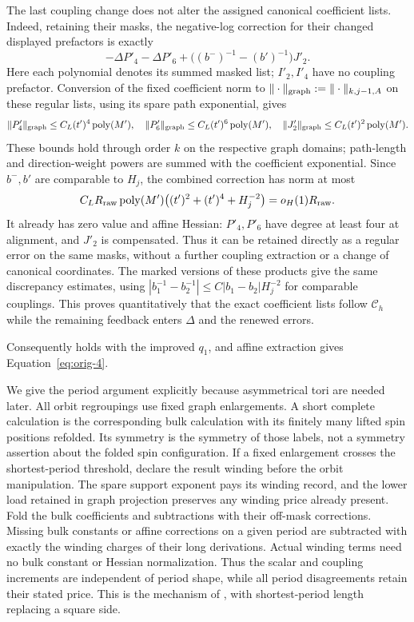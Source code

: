 The last coupling change does not alter the assigned canonical
coefficient lists.  Indeed, retaining their masks, the negative-log
correction for their changed displayed prefactors is exactly
\[
 -\Delta P'_4-\Delta P'_6
       +\bigl((b^-)^{-1}-(b')^{-1}\bigr)J'_2.
\]
Here each polynomial denotes its summed masked list; $I'_2,I'_4$
have no coupling prefactor.  Conversion of the fixed coefficient norm
to $\|\cdot\|_{\rm graph}:=\|\cdot\|_{k,j-1,A}$ on these
regular lists, using its spare path exponential, gives
\[
 \|P'_4\|_{\rm graph}\le C_L(t')^4\operatorname{poly}(M'),
 \quad
 \|P'_6\|_{\rm graph}\le C_L(t')^6\operatorname{poly}(M'),
 \quad
 \|J'_2\|_{\rm graph}\le C_L(t')^2\operatorname{poly}(M').
\]
These bounds hold through order $k$ on the respective graph domains;
path-length and direction-weight powers are summed with the
coefficient exponential.  Since $b^-,b'$ are comparable to $H_j$,
the combined correction has norm at most
\[
 C_LR_{\rm raw}\operatorname{poly}(M')
           \bigl((t')^2+(t')^4+H_j^{-2}\bigr)
       =o_H(1)R_{\rm raw}.
\]
It already has zero value and affine Hessian: $P'_4,P'_6$ have degree
at least four at alignment, and $J'_2$ is compensated.  Thus it can
be retained directly as a regular error on the same masks, without a
further coupling extraction or a change of canonical coordinates.
The marked versions of these products give the same discrepancy
estimates, using $|b_1^{-1}-b_2^{-1}|\le C|b_1-b_2|H_j^{-2}$
for comparable couplings.  This proves quantitatively that the
exact coefficient lists follow $\mathcal C_h$ while the remaining
feedback enters $\Delta$ and the renewed errors.

Consequently  holds with the improved $q_1$,
and affine extraction gives Equation~\eqref{eq:orig-4}.

We give the period argument explicitly because asymmetrical tori are
needed later.  All orbit regroupings use fixed graph enlargements.
A short complete calculation is the corresponding bulk calculation
with its finitely many lifted spin positions refolded.  Its symmetry
is the symmetry of those labels, not a symmetry assertion about the
folded spin configuration.  If a fixed enlargement crosses the
shortest-period threshold, declare the result winding before the
orbit manipulation.  The spare support exponent pays its winding
record, and the lower load retained in graph projection preserves
any winding price already present.  Fold the bulk coefficients and
subtractions with their off-mask corrections.  Missing bulk constants
or affine corrections on a given period are subtracted with exactly
the winding charges of their long derivations.  Actual winding terms
need no bulk constant or Hessian normalization.  Thus the scalar and
coupling increments are independent of period shape, while all
period disagreements retain their stated price.  This is the
mechanism of , with shortest-period length
replacing a square side.

